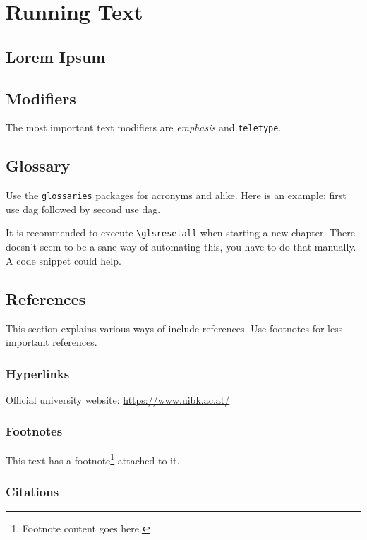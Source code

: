 \chapter{Running Text}

\section{Lorem Ipsum}

\lipsum[1-2]

\section{Modifiers}

The most important text modifiers are \emph{emphasis} and \texttt{teletype}.

\section{Glossary}

Use the \texttt{glossaries} packages for acronyms and alike.
Here is an example: first use \gls{dag} followed by second use \gls{dag}.

It is recommended to execute \texttt{\textbackslash{}glsresetall} when starting a new chapter.
There doesn't seem to be a sane way of automating this, you have to do that manually.
A code snippet could help.

\section{References}

This section explains various ways of include references.
Use footnotes for less important references.

\subsection{Hyperlinks}

Official university website: \url{https://www.uibk.ac.at/}

\subsection{Footnotes}

This text has a footnote\footnote{Footnote content goes here.} attached to it.

\subsection{Citations}

